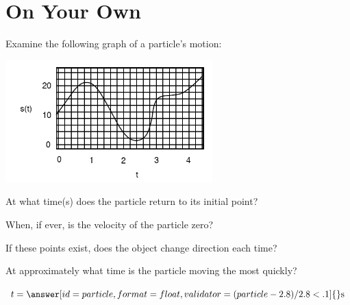 \documentclass{ximera}
\begin{document}
\section{On Your Own}
\begin{question}
Examine the following graph of a particle's motion:

\begin{image}
    \includegraphics[width=80mm]{position.png}
\end{image}

At what time(s) does the particle return to its initial point?

\begin{selectAll}
\end{selectAll}

When, if ever, is the velocity of the particle zero?

\begin{selectAll}
\end{selectAll}

If these points exist, does the object change direction each time?

\begin{multipleChoice}
\end{multipleChoice}

At approximately what time is the particle moving the most quickly?

$t = \answer[id=particle,format=float,validator= (particle-2.8)/2.8 < .1]{} \text{s}$
\end{question}
\end{document}
